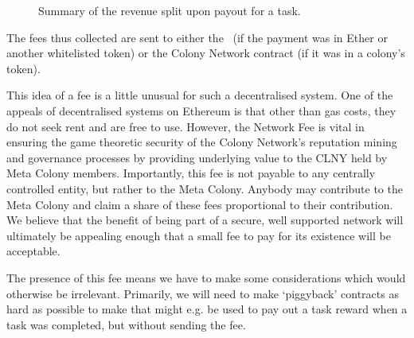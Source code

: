 \begin{figure}[htp]
\centering
 \caption{Summary of the revenue split upon payout for a task.}
 \label{fig:revenueSplit}

\end{figure}

The fees thus collected are sent to either the \rc\ (if the payment was in Ether or another whitelisted token) or the Colony Network contract (if it was in a colony's token).

This idea of a fee is a little unusual for such a decentralised system. One of the appeals of decentralised systems on Ethereum is that other than gas costs, they do not seek rent and are free to use. However, the Network Fee is vital in ensuring the game theoretic security of the Colony Network's reputation mining and governance processes by providing underlying value to the CLNY held by Meta Colony members. Importantly, this fee is not payable to any centrally controlled entity, but rather to the Meta Colony. Anybody may contribute to the Meta Colony and claim a share of these fees proportional to their contribution. We believe that the benefit of being part of a secure, well supported network will ultimately be appealing enough that a small fee to pay for its existence will be acceptable.

The presence of this fee means we have to make some considerations which would otherwise be irrelevant. Primarily, we will need to make `piggyback' contracts as hard as possible to make that might e.g. be used to pay out a task reward when a task was completed, but without sending the fee.

